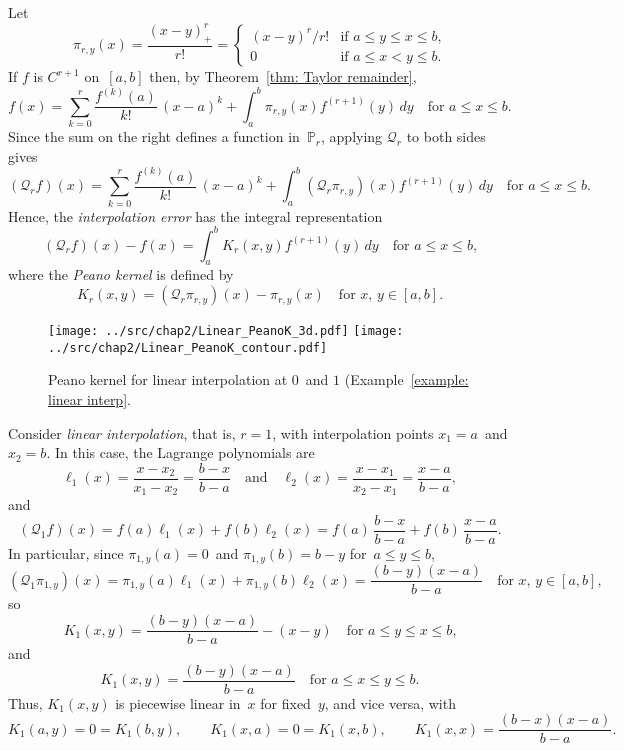 Let 
\[
\pi_{r,y}(x)=\frac{(x-y)_+^r}{r!}=\begin{cases}
	(x-y)^r/r!&\text{if $a\le y\le x\le b$,}\\
	0&\text{if $a\le x<y\le b$.}
\end{cases}
\]
If $f$ is $C^{r+1}$ on~$[a,b]$ then, by Theorem~\ref{thm: Taylor remainder}, 
\[
f(x)=\sum_{k=0}^r\frac{f^{(k)}(a)}{k!}\,(x-a)^k
	+\int_a^b\pi_{r,y}(x)f^{(r+1)}(y)\,dy\quad\text{for $a\le x\le b$.}
\]
Since the sum on the right defines a function in~$\mathbb{P}_r$,
applying $\mathcal{Q}_r$ to both sides gives
\[
(\mathcal{Q}_rf)(x)=\sum_{k=0}^r\frac{f^{(k)}(a)}{k!}\,(x-a)^k
	+\int_a^b(\mathcal{Q}_r\pi_{r,y})(x)f^{(r+1)}(y)\,dy
\quad\text{for $a\le x\le b$.}
\]
Hence, the \emph{interpolation error} has the integral representation
\begin{equation}\label{eq: Qr f error}
(\mathcal{Q}_rf)(x)-f(x)=\int_a^b K_r(x,y)f^{(r+1)}(y)\,dy
\quad\text{for $a\le x\le b$,}
\end{equation}
where the \emph{Peano kernel} is defined by
\[
K_r(x,y)=(\mathcal{Q}_r\pi_{r,y})(x)-\pi_{r,y}(x)
	\quad\text{for $x$, $y\in[a,b]$.}
\]

\begin{figure}
\caption{Peano kernel for linear interpolation at $0$~and $1$
(Example~\ref{example: linear interp}.}
\label{fig: linear Peano}
\begin{center}
\texttt{[image: ../src/chap2/Linear\_PeanoK\_3d.pdf]}
\texttt{[image: ../src/chap2/Linear\_PeanoK\_contour.pdf]}
\end{center}
\end{figure}

\begin{example}\label{example: linear interp}
Consider \emph{linear interpolation}, that is, $r=1$, with interpolation points 
$x_1=a$~and $x_2=b$.  In this case, the Lagrange polynomials are
\[
\ell_1(x)=\frac{x-x_2}{x_1-x_2}=\frac{b-x}{b-a}
\quad\text{and}\quad
\ell_2(x)=\frac{x-x_1}{x_2-x_1}=\frac{x-a}{b-a},
\]
and
\[
(\mathcal{Q}_1f)(x)=f(a)\ell_1(x)+f(b)\ell_2(x)
	=f(a)\,\frac{b-x}{b-a}+f(b)\,\frac{x-a}{b-a}.
\]
In particular, since $\pi_{1,y}(a)=0$~and $\pi_{1,y}(b)=b-y$ for~$a\le y\le b$,
\[
(\mathcal{Q}_1\pi_{1,y})(x)=\pi_{1,y}(a)\ell_1(x)+\pi_{1,y}(b)\ell_2(x)
	=\frac{(b-y)(x-a)}{b-a}\quad\text{for $x$, $y\in[a,b]$,}
\]
so
\[
K_1(x,y)=\frac{(b-y)(x-a)}{b-a}-(x-y)\quad\text{for $a\le y\le x\le b$,}
\]
and
\[
K_1(x,y)=\frac{(b-y)(x-a)}{b-a}\quad\text{for $a\le x\le y\le b$.}
\]
Thus, $K_1(x,y)$ is piecewise linear in~$x$ for fixed~$y$, and vice versa, with
\[
K_1(a,y)=0=K_1(b,y),\qquad K_1(x,a)=0=K_1(x,b),\qquad
K_1(x,x)=\frac{(b-x)(x-a)}{b-a}.
\]
\end{example}

